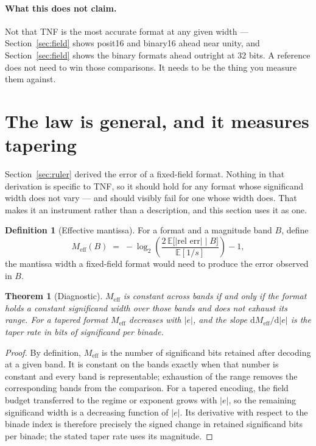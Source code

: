 \documentclass[11pt]{article}
\newtheorem{theorem}{Theorem}
\theoremstyle{definition}
\newtheorem{definition}{Definition}
\begin{document}
\paragraph{What this does not claim.} Not that TNF is the most accurate format
at any given width --- Section~\ref{sec:field} shows posit16 and binary16 ahead
near unity, and Section~\ref{sec:field} shows the binary formats ahead outright at
32 bits. A reference does not need to win those comparisons. It needs to be the
thing you measure them against.


\section{The law is general, and it measures tapering}\label{sec:law}

Section~\ref{sec:ruler} derived the error of a fixed-field format. Nothing in that
derivation is specific to TNF, so it should hold for any format whose significand
width does not vary --- and should visibly fail for one whose width does. That
makes it an instrument rather than a description, and this section uses it as one.

\begin{definition}[Effective mantissa]
For a format and a magnitude band $B$, define
\[
  M_{\mathrm{eff}}(B) \;=\; -\log_2\!\left(\frac{2\,\mathbb{E}\bigl[|\text{rel err}|\;\big|\;B\bigr]}{\mathbb{E}[1/s]}\right) - 1 ,
\]
the mantissa width a fixed-field format would need to produce the error observed
in $B$.
\end{definition}

\begin{theorem}[Diagnostic]\label{thm:diag}
$M_{\mathrm{eff}}$ is constant across bands if and only if the format holds a
constant significand width over those bands and does not exhaust its range. For a
tapered format $M_{\mathrm{eff}}$ decreases with $|e|$, and the slope
$\mathrm{d}M_{\mathrm{eff}}/\mathrm{d}|e|$ is the taper rate in bits of
significand per binade.
\end{theorem}
\begin{proof}
By definition, $M_{\mathrm{eff}}$ is the number of significand bits retained
after decoding at a given band. It is constant on the bands exactly when that
number is constant and every band is representable; exhaustion of the range
removes the corresponding bands from the comparison. For a tapered encoding,
the field budget transferred to the regime or exponent grows with $|e|$, so the
remaining significand width is a decreasing function of $|e|$. Its derivative
with respect to the binade index is therefore precisely the signed change in
retained significand bits per binade; the stated taper rate uses its magnitude.
\end{proof}
\end{document}
